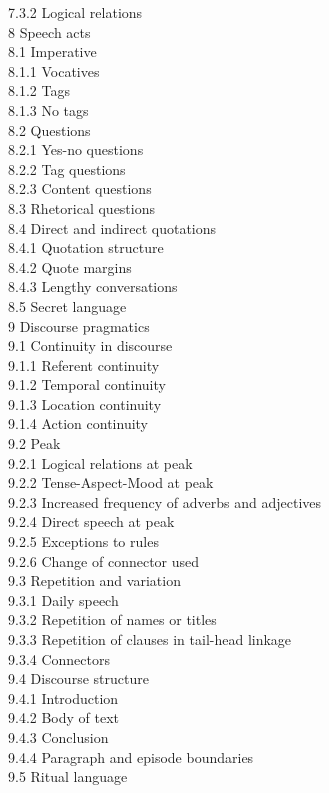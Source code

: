 \documentclass[10pt]{article}
\begin{document}
7.3.2 Logical relations\\
8 Speech acts\\
8.1 Imperative\\
8.1.1 Vocatives\\
8.1.2 Tags\\
8.1.3 No tags\\
8.2 Questions\\
8.2.1 Yes-no questions\\
8.2.2 Tag questions\\
8.2.3 Content questions\\
8.3 Rhetorical questions\\
8.4 Direct and indirect quotations\\
8.4.1 Quotation structure\\
8.4.2 Quote margins\\
8.4.3 Lengthy conversations\\
8.5 Secret language\\
9 Discourse pragmatics\\
9.1 Continuity in discourse\\
9.1.1 Referent continuity\\
9.1.2 Temporal continuity\\
9.1.3 Location continuity\\
9.1.4 Action continuity\\
9.2 Peak\\
9.2.1 Logical relations at peak\\
9.2.2 Tense-Aspect-Mood at peak\\
9.2.3 Increased frequency of adverbs and adjectives\\
9.2.4 Direct speech at peak\\
9.2.5 Exceptions to rules\\
9.2.6 Change of connector used\\
9.3 Repetition and variation\\
9.3.1 Daily speech\\
9.3.2 Repetition of names or titles\\
9.3.3 Repetition of clauses in tail-head linkage\\
9.3.4 Connectors\\
9.4 Discourse structure\\
9.4.1 Introduction\\
9.4.2 Body of text\\
9.4.3 Conclusion\\
9.4.4 Paragraph and episode boundaries\\
9.5 Ritual language\\
\end{document}
